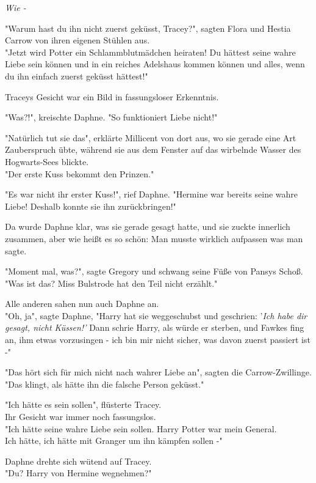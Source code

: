 {\emph{Wie -}

"Warum hast du ihn nicht zuerst geküsst, Tracey?", sagten Flora und Hestia Carrow von ihren eigenen Stühlen aus.\\ "Jetzt wird Potter ein Schlammblutmädchen heiraten! Du hättest seine wahre Liebe sein können und in ein reiches Adelshaus kommen können und alles, wenn du ihn einfach zuerst geküsst hättest!"

Traceys Gesicht war ein Bild in fassungsloser Erkenntnis.

"Was?!", kreischte Daphne. "So funktioniert Liebe nicht!"

"Natürlich tut sie das", erklärte Millicent von dort aus, wo sie gerade eine Art Zauberspruch übte, während sie aus dem Fenster auf das wirbelnde Wasser des Hogwarts-Sees blickte.\\ "Der erste Kuss bekommt den Prinzen."

"Es war nicht ihr erster Kuss!", rief Daphne. "Hermine war bereits seine wahre Liebe! Deshalb konnte sie ihn zurückbringen!"

Da wurde Daphne klar, was sie gerade gesagt hatte, und sie zuckte innerlich zusammen, aber wie heißt es so schön: Man musste wirklich aufpassen was man sagte.

"Moment mal, was?", sagte Gregory und schwang seine Füße von Pansys Schoß.\\ "Was ist das? Miss Bulstrode hat den Teil nicht erzählt."

Alle anderen sahen nun auch Daphne an.\\ "Oh, ja", sagte Daphne, "Harry hat sie weggeschubst und geschrien: '\emph{Ich habe dir gesagt, nicht Küssen!'} Dann schrie Harry, als würde er sterben, und Fawkes fing an, ihm etwas vorzusingen - ich bin mir nicht sicher, was davon zuerst passiert ist -"

"Das hört sich für mich nicht nach wahrer Liebe an", sagten die Carrow-Zwillinge.\\ "Das klingt, als hätte ihn die falsche Person geküsst."

"Ich hätte es sein sollen", flüsterte Tracey.\\ Ihr Gesicht war immer noch fassungslos.\\ "Ich hätte seine wahre Liebe sein sollen. Harry Potter war mein General.\\ Ich hätte, ich hätte mit Granger um ihn kämpfen sollen -"

Daphne drehte sich wütend auf Tracey.\\ "Du? Harry von Hermine wegnehmen?"

}
